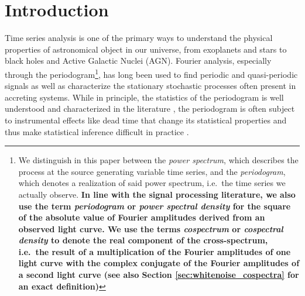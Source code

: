 \documentclass[12pt]{emulateapj}
\begin{document}







\section{Introduction}

Time series analysis is one of the primary ways to understand the physical properties of astronomical object in our universe, from exoplanets and stars to black holes and Active Galactic Nuclei (AGN). 
Fourier analysis, especially through the periodogram\footnote{We distinguish in this paper between the \textit{power spectrum}, which describes the process at the source generating variable time series, and the \textit{periodogram}, which denotes a realization of said power spectrum, i.e.\ the time series we actually observe. \textbf{In line with the signal processing literature, we also use the term \textit{periodogram} or \textit{power spectral density} for the square of the absolute value of Fourier amplitudes derived from an observed light curve. We use the terms \textit{cospectrum} or \textit{cospectral density} to denote the real component of the cross-spectrum, i.e.\ the result of a multiplication of the Fourier amplitudes of one light curve with the complex conjugate of the Fourier amplitudes of a second light curve (see also Section \ref{sec:whitenoise_cospectra} for an exact definition)}}, has long been used to find periodic and quasi-periodic signals as well as characterize the stationary stochastic processes often present in accreting systems. 
While in principle, the statistics of the periodogram is well understood and characterized in the literature \citep[e.g.][]{vanderklis1989}, the periodogram is often subject to instrumental effects like dead time that change its statistical properties and thus make statistical inference difficult in practice \citep[e.g.][]{Zhang+95}.
\end{document}
